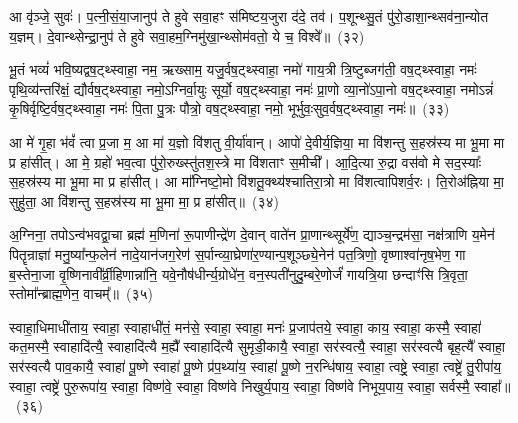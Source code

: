 आ वृ॑ञ्जे॒ सुवः॑। प॒त्नी॒सं॒या॒जानुप॑ ते हुवे सवा॒हꣳ स॑मिष्टय॒जुरा द॑दे॒ तव॑। प॒शून्थ्सु॒तं पु॑रो॒डाशा॒न्थ्सव॑ना॒न्योत य॒ज्ञम्। दे॒वान्थ्सेन्द्रा॒नुप॑ ते हुवे सवा॒हम॒ग्निमु॑खा॒न्थ्सोम॑वतो॒ ये च॒ विश्वे᳚॥~(३२)\ip

{\anuvakamend[{उप॒ ग्रह॒मिडा॑मा॒शिषो॒ द्वात्रिꣳ॑शच्च}]}%

भू॒तं भव्यं॑ भवि॒ष्यद्वष॒ट्थ्\-स्वाहा॒ नम॒ ऋख्साम॒ यजु॒र्वष॒ट्थ्\-स्वाहा॒ नमो॑ गाय॒त्री त्रि॒ष्टुब्जग॑ती॒ वष॒ट्थ्\-स्वाहा॒ नमः॑ पृथि॒व्य॑न्तरि॑क्षं॒ द्यौर्वष॒ट्थ्\-स्वाहा॒ नमो॒\-ऽग्निर्वा॒युः सूर्यो॒ वष॒ट्थ्\-स्वाहा॒ नमः॑ प्रा॒णो व्या॒नो॑\-ऽपा॒नो वष॒ट्थ्\-स्वाहा॒ नमो\-ऽन्नं॑ कृ॒षिर्वृष्टि॒र्वष॒ट्थ्\-स्वाहा॒ नमः॑ पि॒ता पु॒त्रः पौत्रो॒ वष॒ट्थ्\-स्वाहा॒ नमो॒ भूर्भुवः॒सुव॒र्वष॒ट्थ्\-स्वाहा॒ नमः॑॥~(३३)\ip

{\anuvakamend[{भुव॑श्च॒त्वारि॑ च}]}%

आ मे॑ गृ॒हा भ॑वं᳚ त्वा प्र॒जा म॒ आ मा॑ य॒ज्ञो वि॑शतु वी॒र्या॑वान्। आपो॑ दे॒वीर्य॒ज्ञिया॒ मा वि॑शन्तु स॒हस्र॑स्य मा भू॒मा मा प्र हा॑सीत्। आ मे॒ ग्रहो॑ भव॒त्वा पु॑रो॒रुख्स्तु॑तश॒स्त्रे मा वि॑शताꣳ स॒मीची᳚। आ॒दि॒त्या रु॒द्रा वस॑वो मे सद॒स्याः᳚ स॒हस्र॑स्य मा भू॒मा मा प्र हा॑सीत्। आ मा᳚ग्निष्टो॒मो वि॑शतू॒क्थ्य॑श्चातिरा॒त्रो मा वि॑शत्वापिशर्व॒रः। ति॒रोअ॑ह्निया मा॒ सुहु॑ता॒ आ वि॑शन्तु स॒हस्र॑स्य मा भू॒मा मा॒ प्र हा॑सीत्॥~(३४)\ip

{\anuvakamend[{अ॒ग्नि॒ष्टो॒मो वि॑शत्व॒ष्टाद॑श च}]}%

अ॒ग्निना॒ तपो\-ऽन्व॑भवद्वा॒चा ब्रह्म॑ म॒णिना॑ रू॒पाणीन्द्रे॑ण दे॒वान् वाते॑न प्रा॒णान्थ्सूर्ये॑ण॒ द्याञ्च॒न्द्रम॑सा॒ नक्ष॑त्राणि य॒मेन॑ पितॄन्राज्ञा॑ मनु॒ष्या᳚न्फ॒लेन॑ नादे॒यान॑जग॒रेण॑ स॒र्पान्व्या॒घ्रेणा॑र॒ण्यान्प॒शूञ्छ्ये॒नेन॑ पत॒त्रिणो॒ वृष्णाश्वा॑नृष॒भेण॒ गा ब॒स्तेना॒जा वृ॒ष्णिनावी᳚र्व्री॒हिणान्ना॑नि॒ यवे॒नौष॑धीर्न्य॒ग्रोधे॑न॒ वन॒स्पती॑नुदु॒म्बरे॒णोर्जं॑ गायत्रि॒या छन्दाꣳ॑सि त्रि॒वृता॒ स्तोमा᳚न्ब्राह्म॒णेन॒ वाचम्᳚॥~(३५)\ip

{\anuvakamend[{ब्रा॒ह्म॒णेनैक॑ञ्च}]}%

स्वाहा॒धिमाधी॑ताय॒ स्वाहा॒ स्वाहाधी॑तं॒ मन॑से॒ स्वाहा॒ स्वाहा॒ मनः॑ प्र॒जा\-प॑तये॒ स्वाहा॒ काय॒ स्वाहा॒ कस्मै॒ स्वाहा॑ कत॒मस्मै॒ स्वाहादि॑त्यै॒ स्वाहादि॑त्यै म॒ह्यै᳚ स्वाहादि॑त्यै सुमृडी॒कायै॒ स्वाहा॒ सर॑स्वत्यै॒ स्वाहा॒ सर॑स्वत्यै बृह॒त्यै᳚ स्वाहा॒ सर॑स्वत्यै पाव॒कायै॒ स्वाहा॑ पू॒ष्णे स्वाहा॑ पू॒ष्णे प्र॑प॒थ्या॑य॒ स्वाहा॑ पू॒ष्णे न॒रन्धि॑षाय॒ स्वाहा॒ त्वष्ट्रे॒ स्वाहा॒ त्वष्ट्रे॑ तु॒रीपा॑य॒ स्वाहा॒ त्वष्ट्रे॑ पुरु॒रूपा॑य॒ स्वाहा॒ विष्ण॑वे॒ स्वाहा॒ विष्ण॑वे निखुर्य॒पाय॒ स्वाहा॒ विष्ण॑वे निभूय॒पाय॒ स्वाहा॒ सर्वस्मै॒ स्वाहा᳚॥~(३६)\ip

